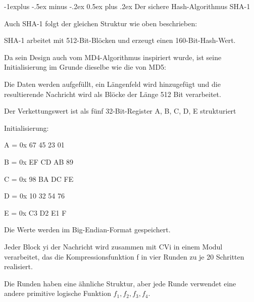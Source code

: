 \documentclass[a4paper]{article}
\makeatletter
\renewcommand{\subsection}{\@startsection{subsection}{2}{0mm}%
 {-1explus -.5ex minus -.2ex}%
 {0.5ex plus .2ex}%
 {\normalfont\normalsize\bfseries}}
\makeatother
\begin{document}
\begin{multicols}{3}
      \subsection{Der sichere Hash-Algorithmus SHA-1}
      \begin{itemize*}
            \item Auch SHA-1 folgt der gleichen Struktur wie oben beschrieben:
            \begin{itemize*}
                  \item SHA-1 arbeitet mit 512-Bit-Blöcken und erzeugt einen 160-Bit-Hash-Wert.
                  \item Da sein Design auch vom MD4-Algorithmus inspiriert wurde, ist seine Initialisierung im Grunde dieselbe wie die von MD5:
                  \begin{itemize*}
                        \item Die Daten werden aufgefüllt, ein Längenfeld wird hinzugefügt und die resultierende Nachricht wird als Blöcke der Länge 512 Bit verarbeitet.
                        \item Der Verkettungswert ist als fünf 32-Bit-Register A, B, C, D, E strukturiert
                        \item Initialisierung:
                        \begin{itemize*}
                              \item A = 0x 67 45 23 01
                              \item B = 0x EF CD AB 89
                              \item C = 0x 98 BA DC FE
                              \item D = 0x 10 32 54 76
                              \item E = 0x C3 D2 E1 F
                        \end{itemize*}
                        \item Die Werte werden im Big-Endian-Format gespeichert.
                  \end{itemize*}
                  \item Jeder Block yi der Nachricht wird zusammen mit CVi in einem Modul verarbeitet, das die Kompressionsfunktion f in vier Runden zu je 20 Schritten realisiert.
                  \begin{itemize*}
                        \item Die Runden haben eine ähnliche Struktur, aber jede Runde verwendet eine andere primitive logische Funktion $f_1, f_2, f_3, f_4$.

\end{itemize*}
\end{itemize*}
\end{itemize*}
\end{multicols}
\end{document}
